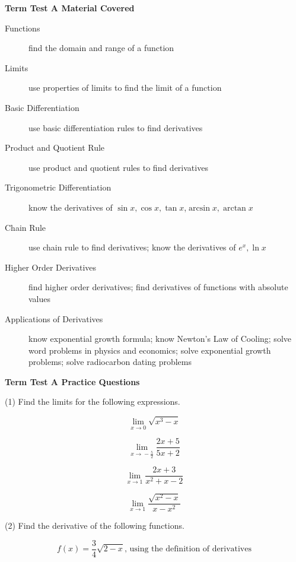 \documentclass[11pt]{article}
\begin{document}
\textbf{Term Test A Material Covered}

\begin{description}
\item[Functions] find the domain and range of a function
\item[Limits] use properties of limits to find the limit of a
  function
\item[Basic Differentiation] use basic differentiation rules to find
  derivatives
\item[Product and Quotient Rule] use product and quotient rules
  to find derivatives
\item[Trigonometric Differentiation] know the derivatives of
  $\sin{}x,\cos{}x,\tan{}x$,$\arcsin{}x,\arctan{}x$
\item[Chain Rule] use chain rule to find derivatives; know the
  derivatives of $e^{x},\ln{}x$
\item[Higher Order Derivatives] find higher order derivatives; find
  derivatives of functions with absolute values
\item[Applications of Derivatives] know exponential growth formula;
  know Newton's Law of Cooling; solve word problems in physics and 
  economics; solve exponential growth problems; solve radiocarbon
  dating problems
\end{description}

\textbf{Term Test A Practice Questions}

(1) Find the limits for the following expressions.

\begin{equation}
  \label{eq:ageebota}
  \lim_{x\rightarrow{}0}\sqrt{x^{3}-x}
\end{equation}

\begin{equation}
  \label{eq:lietefie}
  \lim_{x\rightarrow{}-\frac{5}{2}}\frac{2x+5}{5x+2}
\end{equation}

\begin{equation}
  \label{eq:waicahng}
  \lim_{x\rightarrow{}1}\frac{2x+3}{x^{2}+x-2}
\end{equation}

\begin{equation}
  \label{eq:moluoloh}
  \lim_{x\rightarrow{}1}\frac{\sqrt{x^{2}-x}}{x-x^{2}}
\end{equation}

(2) Find the derivative of the following functions.

\begin{equation}
  \label{eq:teeheeko}
  f(x)=\frac{3}{4}\sqrt{2-x}\mbox{, using the definition of derivatives}
\end{equation}
\end{document}
